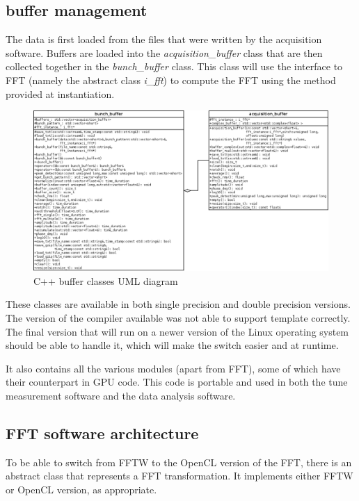 \subsection{buffer management}

The data is first loaded from the files that were written by the
acquisition software. Buffers are loaded into the
\emph{acquisition\_buffer} class that are then collected together in
the \emph{bunch\_buffer} class. This class will use the interface to
\gls{FFT} (namely the abstract class \emph{i\_fft}) to compute the
\gls{FFT} using the method provided at instantiation.

\begin{figure}[H]
\centering
\caption{C++ buffer classes UML diagram}
\includegraphics[scale=0.3]{buffer_uml.png}
\end{figure}

These classes are available in both single precision and double
precision versions. The version of the compiler available was not able
to support template correctly. The final version that will run on a
newer version of the Linux operating system should be able to handle
it, which will make the switch easier and at runtime.

It also contains all the various modules (apart from \gls{FFT}), some of which have their counterpart in \gls{GPU} code. This code is portable and used in both the tune measurement software and the data analysis software.

\subsection{FFT software architecture}

To be able to switch from \gls{FFTW} to the \gls{OpenCL} version of the \gls{FFT}, there is an abstract class that represents a \gls{FFT} transformation. It implements either \gls{FFTW} or \gls{OpenCL} version, as appropriate.

